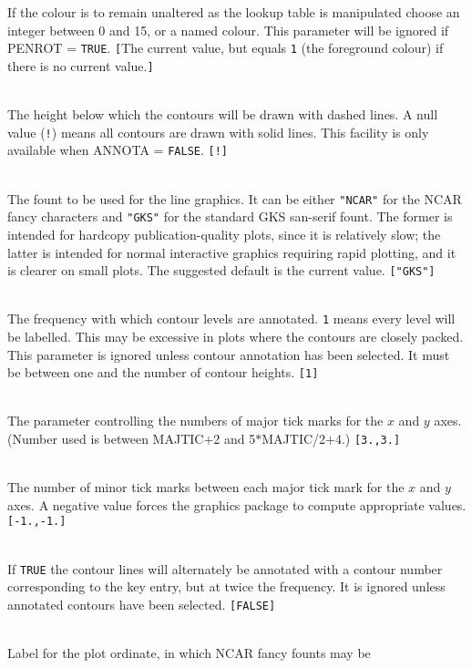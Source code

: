 \documentclass[twoside,11pt]{article}
\newcommand{\sstsubsection}[1]{ \item[{#1}] \mbox{} \\}
\newcommand{\sstsubsection}[1]{\item[{#1}]}
\begin{document}
{{{         If the colour is to remain unaltered as the lookup table is
         manipulated choose an integer between 0 and 15, or a named
         colour.  This parameter will be ignored if PENROT = {\tt TRUE}.
         {\tt [}The current value, but equals {\tt 1} (the foreground
         colour) if there is no current value.{\tt ]}
      }
      \sstsubsection{
         DASHED = \_REAL (Read)
      }{
         The height below which the contours will be drawn with dashed
         lines.  A null value ({\tt !}) means all contours are drawn with
         solid lines.  This facility is only available when ANNOTA =
         {\tt FALSE}. {\tt [!]}
      }
      \sstsubsection{
         FONT = LITERAL (Read)
      }{
         The fount to be used for the line graphics.  It can be either
         {\tt "NCAR"} for the NCAR fancy characters and {\tt "GKS"} for the standard
         GKS san-serif fount.   The former is intended for hardcopy
         publication-quality plots, since it is relatively slow; the
         latter is intended for normal interactive graphics requiring
         rapid plotting, and it is clearer on small plots. The
         suggested default is the current value. {\tt ["GKS"]}
      }
      \sstsubsection{
         LABELFREQ = \_INTEGER (Read)
      }{
         The frequency with which contour levels are annotated.  {\tt 1}
         means every level will be labelled.  This may be excessive in
         plots where the contours are closely packed.  This parameter
         is ignored
         unless contour annotation has been selected.  It must be between
         one and the number of contour heights. {\tt [1]}
      }
      \sstsubsection{
         MAJTIC( 2 ) = \_REAL (Read)
      }{
         The parameter controlling the numbers of major tick marks
         for the $x$ and $y$ axes.  (Number used is between MAJTIC$+$2 and
         5$*$MAJTIC/2$+$4.) {\tt [3.,3.]}
      }
      \sstsubsection{
         MINTIC( 2 ) = \_REAL (Read)
      }{
         The number of minor tick marks between each major tick mark
         for the $x$ and $y$ axes.  A negative value forces the graphics
         package to compute appropriate values. {\tt [-1.,-1.]}
      }
      \sstsubsection{
         NOISY = \_LOGICAL (Read)
      }{
         If {\tt TRUE} the contour lines will alternately be annotated with
         a contour number corresponding to the key entry, but at
         twice the frequency.  It is ignored unless annotated contours
         have been selected. {\tt [FALSE]}
      }
      \sstsubsection{
         ORDLAB  =  LITERAL (Read)
      }{
         Label for the plot ordinate, in which NCAR fancy founts may be
}}}
\end{document}
